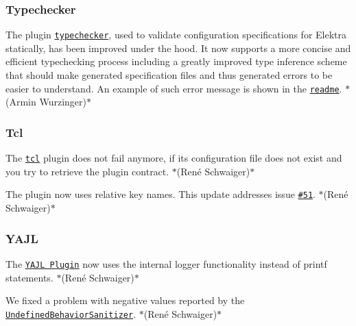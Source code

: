 \subsubsection*{Typechecker}


\begin{DoxyItemize}
\item The plugin \href{https://www.libelektra.org/plugins/typechecker}{\tt typechecker}, used to validate configuration specifications for Elektra statically, has been improved under the hood. It now supports a more concise and efficient typechecking process including a greatly improved type inference scheme that should make generated specification files and thus generated errors to be easier to understand. An example of such error message is shown in the \href{https://www.libelektra.org/plugins/typechecker}{\tt readme}. $\ast$(Armin Wurzinger)$\ast$
\end{DoxyItemize}

\subsubsection*{Tcl}


\begin{DoxyItemize}
\item The \href{http://libelektra.org/plugins/tcl}{\tt {\ttfamily tcl}} plugin does not fail anymore, if its configuration file does not exist and you try to retrieve the plugin contract. $\ast$(René Schwaiger)$\ast$
\item The plugin now uses relative key names. This update addresses issue \href{https://issues.libelektra.org/51}{\tt \#51}. $\ast$(René Schwaiger)$\ast$
\end{DoxyItemize}

\subsubsection*{Y\+A\+JL}


\begin{DoxyItemize}
\item The \href{http://libelektra.org/plugins/yajl}{\tt Y\+A\+JL Plugin} now uses the internal logger functionality instead of {\ttfamily printf} statements. $\ast$(René Schwaiger)$\ast$
\item We fixed a problem with negative values reported by the \href{https://clang.llvm.org/docs/UndefinedBehaviorSanitizer.html}{\tt Undefined\+Behavior\+Sanitizer}. $\ast$(René Schwaiger)$\ast$
\end{DoxyItemize}

